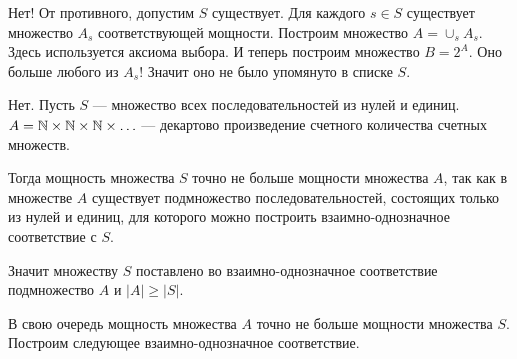 \begin{solution}{1.3}
Нет! От противного, допустим $S$ существует. Для каждого $s\in S$ существует множество $A_{s}$ соответствующей мощности. Построим множество $A=\cup_{s}A_{s}$. Здесь используется аксиома выбора. И теперь построим множество $B=2^{A}$. Оно больше любого из $A_{s}$! Значит оно не было упомянуто в списке $S$.
\end{solution}
\begin{solution}{1.4}
Нет. Пусть $S$ --- множество всех последовательностей из нулей и единиц. $A = \mathbb N \times \mathbb N \times \mathbb N \times \ldots$ --- декартово произведение счетного количества счетных множеств.

Тогда мощность множества $S$ точно не больше мощности множества $A$, так как в множестве $A$ существует подмножество последовательностей, состоящих только из нулей и единиц, для которого можно построить взаимно-однозначное соответствие с $S$.

Значит множеству $S$ поставлено во взаимно-однозначное соответствие подмножество $A$ и $|A| \ge |S|$.

В свою очередь мощность множества $A$ точно не больше мощности множества $S$. Построим следующее взаимно-однозначное соответствие.


\end{solution}
